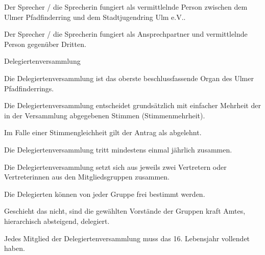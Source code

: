 \begin{legal}
\begin{legal}
\begin{legal}
                  \end{legal}
            \item Der Sprecher / die Sprecherin fungiert als vermittlelnde Person zwischen dem 
                  Ulmer Pfadfinderring und dem Stadtjugendring Ulm e.V..
            \item Der Sprecher / die Sprecherin fungiert als Ansprechpartner und vermittlelnde 
                  Person gegenüber Dritten.
        \end{legal}
    \item Delegiertenversammlung
        \begin{legal}
            \item Die Delegiertenversammlung ist das oberste beschlussfassende Organ
                  des Ulmer Pfadfinderrings.
            \item Die Delegiertenversammlung entscheidet grundsätzlich mit einfacher Mehrheit der 
                  in der Versammlung abgegebenen Stimmen (Stimmenmehrheit).
            \item Im Falle einer Stimmengleichheit gilt der Antrag als abgelehnt.
            \item Die Delegiertenversammlung tritt mindestens einmal jährlich zusammen.
            \item Die Delegiertenversammlung setzt sich aus jeweils zwei Vertretern oder 
                  Vertreterinnen aus den Mitgliedsgruppen zusammen.
                \begin{legal}
                    \item Die Delegierten können von jeder Gruppe frei bestimmt werden.
                    \item Geschieht das nicht, sind die gewählten Vorstände der Gruppen kraft Amtes, 
                          hierarchisch absteigend, delegiert.
                \end{legal}
            \item Jedes Mitglied der Delegiertenversammlung muss das 16. Lebensjahr vollendet haben.

\end{legal}
\end{legal}
